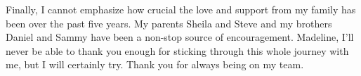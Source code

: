 \documentclass[12pt]{book}
\begin{document}
Finally, I cannot emphasize how crucial the love and support from my family
has been over the past five years. My parents Sheila and Steve and my brothers
Daniel and Sammy have been a non-stop source of encouragement.
Madeline, I'll never be able to thank you enough for sticking through this whole
journey with me, but I will certainly try. Thank you for always being on my team.


\clearpage

\pagestyle{headings}
\setcounter{page}{1}
\renewcommand{\chaptermark}[1]{\markboth{\sc{\chaptername\ \thechapter.\ #1}}{}}
\renewcommand{\sectionmark}[1]{\markright{\sc{\thesection.\ #1}}{}}





\clearpage
{}
\singlespacing


%
\end{document}
